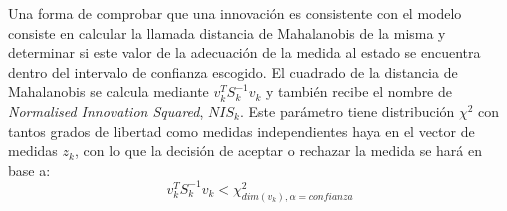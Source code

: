 Una forma de comprobar que una innovación es consistente con el modelo consiste en calcular la llamada distancia de Mahalanobis de la misma y determinar si este valor de la adecuación de la medida al estado se encuentra dentro del intervalo de confianza escogido. El cuadrado de la distancia de Mahalanobis se calcula mediante $v_{k}^{T}S_{k}^{-1}v_{k}$ y también recibe el nombre de \emph{Normalised Innovation Squared}, $NIS_{k}$. Este parámetro tiene distribución $\chi^{2}$ con tantos grados de libertad como medidas independientes haya en el vector de medidas $z_{k}$, con lo que la decisión de aceptar o rechazar la medida se hará en base a:
\begin{equation}\label{eq:mahalanobis}
    v_{k}^{T}S_{k}^{-1}v_{k}<\chi^{2}_{dim(v_{k}),\alpha = confianza}
\end{equation}

